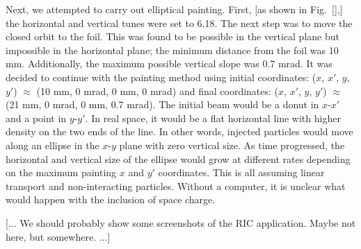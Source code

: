 Next, we attempted to carry out elliptical painting. First, [as shown in Fig.~\ref{},] the horizontal and vertical tunes were set to 6.18. The next step was to move the closed orbit to the foil. This was found to be possible in the vertical plane but impossible in the horizontal plane; the minimum distance from the foil was 10 mm. Additionally, the maximum possible vertical slope was 0.7 mrad. It was decided to continue with the painting method using initial coordinates: ($x$, $x'$, $y$, $y'$) $\approx$ (10 mm, 0 mrad, 0 mm, 0 mrad) and final coordinates: ($x$, $x'$, $y$, $y'$) $\approx$ (21 mm, 0 mrad, 0 mm, 0.7 mrad). The initial beam would be a donut in $x$-$x'$ and a point in $y$-$y'$. In real space, it would be a flat horizontal line with higher density on the two ends of the line. In other words, injected particles would move along an ellipse in the $x$-$y$ plane with zero vertical size. As time progressed, the horizontal and vertical size of the ellipse would grow at different rates depending on the maximum painting $x$ and $y'$ coordinates. This is all assuming linear transport and non-interacting particles. Without a computer, it is unclear what would happen with the inclusion of space charge.

[... We should probably show some screenshots of the RIC application. Maybe not here, but somewhere. ...]

